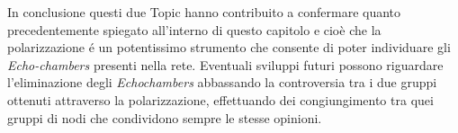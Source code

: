 In conclusione questi due Topic hanno contribuito a confermare quanto precedentemente spiegato all'interno di questo capitolo e cioè che la polarizzazione \'e un potentissimo strumento che consente di poter individuare gli \textit{Echo-chambers} presenti nella rete. %
Eventuali sviluppi futuri possono riguardare l'eliminazione degli \textit{Echochambers} abbassando la controversia tra i due gruppi ottenuti attraverso la polarizzazione, effettuando dei congiungimento tra quei gruppi di nodi che condividono sempre le stesse opinioni.

